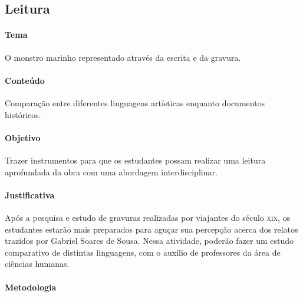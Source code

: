 \documentclass[12pt]{extarticle}
\begin{document}
\subsection{Leitura}

\paragraph{Tema} O monstro marinho representado através da escrita e da gravura.

\paragraph{Conteúdo} Comparação entre diferentes linguagens artísticas enquanto documentos históricos.

\paragraph{Objetivo} Trazer instrumentos para que os estudantes possam realizar uma leitura aprofundada da obra 
com uma abordagem interdisciplinar.

\paragraph{Justificativa} Após a pesquisa e estudo de gravuras realizadas por viajantes do século \textsc{xix},
os estudantes estarão mais preparados para aguçar sua percepção acerca dos relatos trazidos por Gabriel
Soares de Sousa. Nessa atividade, poderão fazer um estudo comparativo de distintas linguagens, com o auxílio de professores
da área de ciências humanas.

\paragraph{Metodologia}
\end{document}
